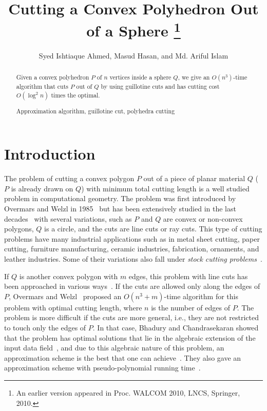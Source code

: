 \documentclass{llncs}
\date{}
\title{Cutting a Convex Polyhedron Out of a Sphere \thanks{An earlier version appeared in Proc. WALCOM 2010, LNCS, Springer, 2010.}}
\author{Syed Ishtiaque Ahmed, Masud Hasan, and Md. Ariful Islam}
\institute{
Department of Computer Science and Engineering\\
Bangladesh University of Engineering and Technology\\
Dhaka-1000, Bangladesh\\
\texttt{http://www.buet.ac.bd/cse}\\ 
\email{\texttt{ishtiaque@csebuet.org, masudhasan@cse.buet.ac.bd, arifulislam@csebuet.org}}
}
\begin{document}
\maketitle{}


\begin{abstract}
Given a convex polyhedron $P$ of $n$ vertices inside a sphere $Q$, we give an $O(n^3)$-time algorithm that cuts $P$ out of $Q$
by using guillotine cuts and has cutting cost $O(\log^2 n)$ times the optimal.

\smallskip

 Approximation algorithm, guillotine cut, polyhedra cutting
\end{abstract}

\section{Introduction} 

The problem of cutting a convex polygon $P$ out of a piece of planar material $Q$ 
($P$ is already drawn on $Q$)
with minimum total cutting length is a well studied problem in computational geometry.
The problem was first introduced by Overmars and Welzl in 1985~\cite{aa}
but has been extensively studied in the last decades~\cite{AIH,aa,ab,ac,ae,ag,ah,ai,am,JK03}
with several variations, such as $P$ and $Q$ are
convex or non-convex polygons, $Q$ is a circle, and the cuts are line cuts or ray cuts.
This type of cutting problems have many industrial applications such as in metal sheet cutting, paper cutting,
furniture manufacturing, ceramic industries, fabrication, ornaments, and leather industries.
Some of their variations also fall under \emph{stock cutting problems}~\cite{ab}.

If $Q$ is another convex polygon with $m$ edges, this problem with line cuts 
has been approached in various ways~\cite{aa,ab,ac,ad,ae,af,ah,ai}.
If the cuts are allowed only along the edges of $P$,
Overmars and Welzl~\cite{aa} proposed an $O(n^{3}+m)$-time algorithm for this problem with optimal cutting length,
where $n$ is the number of edges of $P$.
The problem is more difficult if the cuts are more general, i.e.,
they are not restricted to touch only the edges of $P$.
In that case, Bhadury and Chandrasekaran showed that the problem has optimal solutions
that lie in the algebraic extension of the input data field~\cite{ab},
and due to this algebraic nature of this problem,
an approximation scheme
is the best that one can achieve~\cite{ab}.
They also gave an approximation scheme
with pseudo-polynomial running time~\cite{ab}.
\end{document}
